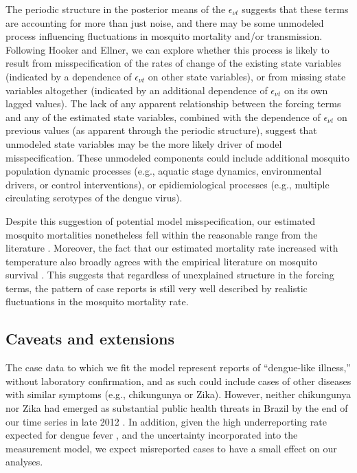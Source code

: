 \documentclass[10pt,letterpaper]{article}
\begin{document}
The periodic structure in the posterior means of the $\epsilon_{\nu t}$ suggests that these terms are accounting for more than just noise, and there may be some unmodeled process influencing fluctuations in mosquito mortality and/or transmission.
Following Hooker and Ellner, we can explore whether this process is likely to result from misspecification of the rates of change of the existing state variables (indicated by a dependence of $\epsilon_{\nu t}$ on other state variables), or from missing state variables altogether (indicated by an additional dependence of $\epsilon_{\nu t}$ on its own lagged values). 
The lack of any apparent relationship between the forcing terms and any of the estimated state variables, combined with the dependence of $\epsilon_{\nu t}$ on previous values (as apparent through the periodic structure), suggest that unmodeled state variables may be the more likely driver of model misspecification.
These unmodeled components could include additional mosquito population dynamic processes (e.g., aquatic stage dynamics, environmental drivers, or control interventions), or epidiemiological processes (e.g., multiple circulating serotypes of the dengue virus).

Despite this suggestion of potential model misspecification, our estimated mosquito mortalities nonetheless fell within the reasonable range from the literature \cite{Maciel-de-Freitas2008, Brady2013}.
Moreover, the fact that our estimated mortality rate increased with temperature also broadly agrees with the empirical literature on mosquito survival \cite{Yang2009, Brady2013}.
This suggests that regardless of unexplained structure in the forcing terms, the pattern of case reports is still very well described by realistic fluctuations in the mosquito mortality rate.

\subsection*{Caveats and extensions}

The case data to which we fit the model represent reports of ``dengue-like illness,'' without laboratory confirmation, and as such could include cases of other diseases with similar symptoms (e.g., chikungunya or Zika).
However, neither chikungunya nor Zika had emerged as substantial public health threats in Brazil by the end of our time series in late 2012 \cite{PAHO2014, PAHO2015}.
In addition, given the high underreporting rate expected for dengue fever \cite{Silva2016}, and the uncertainty incorporated into the measurement model, we expect misreported cases to have a small effect on our analyses.
\end{document}
